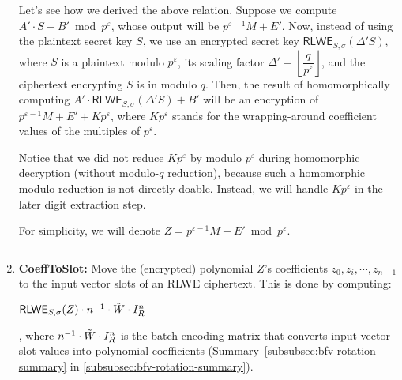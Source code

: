 \begin{enumerate}

$ $

Let's see how we derived the above relation. Suppose we compute $A'\cdot S + B' \bmod p^\varepsilon$, whose output will be $p^{\varepsilon-1}M + E'$. Now, instead of using the plaintext secret key $S$, we use an encrypted secret key $\textsf{RLWE}_{S, \sigma}(\Delta' S)$, where $S$ is a plaintext modulo $p^\varepsilon$, its scaling factor $\Delta' = \left\lfloor\dfrac{q}{p^\varepsilon}\right\rfloor$, and the ciphertext encrypting $S$ is in modulo $q$. Then, the result of homomorphically computing $A'\cdot \textsf{RLWE}_{S, \sigma}(\Delta' S) + B'$ will be an encryption of $p^{\varepsilon-1}M + E' + Kp^\varepsilon$, where $Kp^\varepsilon$ stands for the wrapping-around coefficient values of the multiples of $p^\varepsilon$. %

Notice that we did not reduce $Kp^\varepsilon$ by modulo $p^\varepsilon$ during homomorphic decryption (without modulo-$q$ reduction), because such a homomorphic modulo reduction is not directly doable. Instead, we will handle $Kp^\varepsilon$ in the later digit extraction step. 


For simplicity, we will denote $Z = p^{\varepsilon-1} M + E' \bmod p^\varepsilon$.

$ $

\item \textbf{\textsf{CoeffToSlot}:} Move the (encrypted) polynomial $Z$'s coefficients $z_0, z_i, \cdots, z_{n-1}$ to the input vector slots of an RLWE ciphertext. This is done by computing: 

$\textsf{RLWE}_{S, \sigma}(Z) \cdot n^{-1}\cdot \tilde{W}\cdot I_R^n$

, where $n^{-1}\cdot \tilde{W}\cdot I_R^n$ is the batch encoding matrix that converts input vector slot values into polynomial coefficients (Summary~\ref*{subsubsec:bfv-rotation-summary} in \autoref{subsubsec:bfv-rotation-summary}). 

$ $


\end{enumerate}
